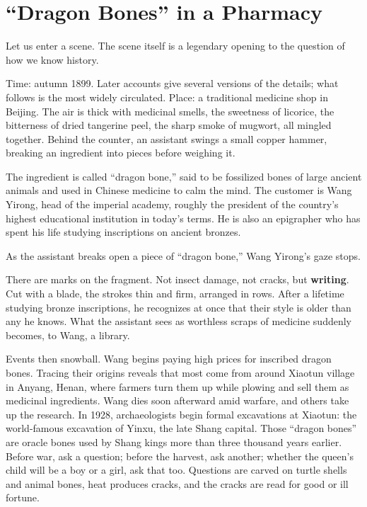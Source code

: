 \section{``Dragon Bones'' in a Pharmacy}
Let us enter a scene. The scene itself is a legendary opening to the question of how we know history.

Time: autumn 1899. Later accounts give several versions of the details; what follows is the most widely circulated. Place: a traditional medicine shop in Beijing. The air is thick with medicinal smells, the sweetness of licorice, the bitterness of dried tangerine peel, the sharp smoke of mugwort, all mingled together. Behind the counter, an assistant swings a small copper hammer, breaking an ingredient into pieces before weighing it.

The ingredient is called ``dragon bone,'' said to be fossilized bones of large ancient animals and used in Chinese medicine to calm the mind. The customer is Wang Yirong, head of the imperial academy, roughly the president of the country's highest educational institution in today's terms. He is also an epigrapher who has spent his life studying inscriptions on ancient bronzes.

As the assistant breaks open a piece of ``dragon bone,'' Wang Yirong's gaze stops.

There are marks on the fragment. Not insect damage, not cracks, but \textbf{writing}. Cut with a blade, the strokes thin and firm, arranged in rows. After a lifetime studying bronze inscriptions, he recognizes at once that their style is older than any he knows. What the assistant sees as worthless scraps of medicine suddenly becomes, to Wang, a library.

Events then snowball. Wang begins paying high prices for inscribed dragon bones. Tracing their origins reveals that most come from around Xiaotun village in Anyang, Henan, where farmers turn them up while plowing and sell them as medicinal ingredients. Wang dies soon afterward amid warfare, and others take up the research. In 1928, archaeologists begin formal excavations at Xiaotun: the world-famous excavation of Yinxu, the late Shang capital. Those ``dragon bones'' are oracle bones used by Shang kings more than three thousand years earlier. Before war, ask a question; before the harvest, ask another; whether the queen's child will be a boy or a girl, ask that too. Questions are carved on turtle shells and animal bones, heat produces cracks, and the cracks are read for good or ill fortune.

